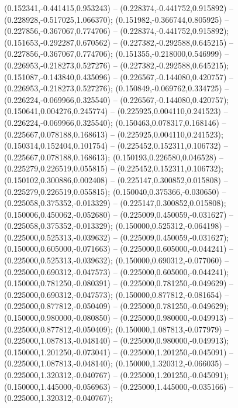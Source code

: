  (0.152341,-0.441415,0.953243) -- (0.228374,-0.441752,0.915892) -- (0.228928,-0.517025,1.066370);
 (0.151982,-0.366744,0.805925) -- (0.227856,-0.367067,0.774706) -- (0.228374,-0.441752,0.915892);
 (0.151653,-0.292287,0.670562) -- (0.227382,-0.292588,0.645215) -- (0.227856,-0.367067,0.774706);
 (0.151355,-0.218000,0.546999) -- (0.226953,-0.218273,0.527276) -- (0.227382,-0.292588,0.645215);
 (0.151087,-0.143840,0.435096) -- (0.226567,-0.144080,0.420757) -- (0.226953,-0.218273,0.527276);
 (0.150849,-0.069762,0.334725) -- (0.226224,-0.069966,0.325540) -- (0.226567,-0.144080,0.420757);
 (0.150641,0.004276,0.245774) -- (0.225925,0.004110,0.241523) -- (0.226224,-0.069966,0.325540);
 (0.150463,0.078317,0.168146) -- (0.225667,0.078188,0.168613) -- (0.225925,0.004110,0.241523);
 (0.150314,0.152404,0.101754) -- (0.225452,0.152311,0.106732) -- (0.225667,0.078188,0.168613);
 (0.150193,0.226580,0.046528) -- (0.225279,0.226519,0.055815) -- (0.225452,0.152311,0.106732);
 (0.150102,0.300886,0.002408) -- (0.225147,0.300852,0.015808) -- (0.225279,0.226519,0.055815);
 (0.150040,0.375366,-0.030650) -- (0.225058,0.375352,-0.013329) -- (0.225147,0.300852,0.015808);
 (0.150006,0.450062,-0.052680) -- (0.225009,0.450059,-0.031627) -- (0.225058,0.375352,-0.013329);
 (0.150000,0.525312,-0.064198) -- (0.225000,0.525313,-0.039632) -- (0.225009,0.450059,-0.031627);
 (0.150000,0.605000,-0.071663) -- (0.225000,0.605000,-0.044241) -- (0.225000,0.525313,-0.039632);
 (0.150000,0.690312,-0.077060) -- (0.225000,0.690312,-0.047573) -- (0.225000,0.605000,-0.044241);
 (0.150000,0.781250,-0.080391) -- (0.225000,0.781250,-0.049629) -- (0.225000,0.690312,-0.047573);
 (0.150000,0.877812,-0.081654) -- (0.225000,0.877812,-0.050409) -- (0.225000,0.781250,-0.049629);
 (0.150000,0.980000,-0.080850) -- (0.225000,0.980000,-0.049913) -- (0.225000,0.877812,-0.050409);
 (0.150000,1.087813,-0.077979) -- (0.225000,1.087813,-0.048140) -- (0.225000,0.980000,-0.049913);
 (0.150000,1.201250,-0.073041) -- (0.225000,1.201250,-0.045091) -- (0.225000,1.087813,-0.048140);
 (0.150000,1.320312,-0.066035) -- (0.225000,1.320312,-0.040767) -- (0.225000,1.201250,-0.045091);
 (0.150000,1.445000,-0.056963) -- (0.225000,1.445000,-0.035166) -- (0.225000,1.320312,-0.040767);
